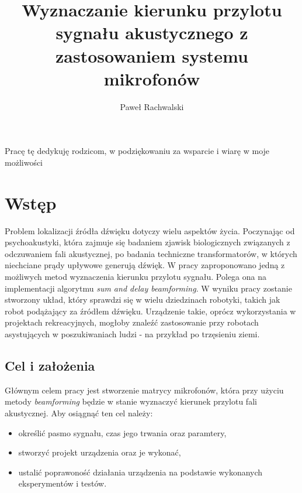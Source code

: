 \documentclass[eng,printmode]{mgr}
\title{Wyznaczanie kierunku przylotu sygnału akustycznego z zastosowaniem systemu mikrofonów}
\author{Paweł Rachwalski}
\begin{document}

\maketitle %
\dedication{6cm}{Pracę tę dedykuję rodzicom, w podziękowaniu za wsparcie i wiarę w moje możliwości}

\tableofcontents %

\chapter{Wstęp}
Problem lokalizacji źródła dźwięku dotyczy wielu aspektów życia. Poczynając od psychoakustyki, która zajmuje się badaniem zjawisk biologicznych związanych z odczuwaniem fali akustycznej, po badania techniczne transformatorów, w których niechciane prądy upływowe generują dźwięk. W pracy zaproponowano jedną z możliwych metod wyznaczenia kierunku przylotu sygnału. Polega ona na implementacji  algorytmu {\em sum and delay beamforming}. W wyniku pracy zostanie stworzony układ, który sprawdzi się w wielu dziedzinach robotyki, takich jak robot podążający za źródłem dźwięku. Urządzenie takie, oprócz wykorzystania w projektach rekreacyjnych, mogłoby znaleźć zastosowanie przy robotach asystujących w poszukiwaniach ludzi - na przykład po trzęsieniu ziemi.

\section{Cel i założenia}
Głównym celem pracy jest stworzenie matrycy mikrofonów, która przy użyciu metody {\em beamforming} będzie w stanie wyznaczyć kierunek przylotu fali akustycznej. Aby osiągnąć ten cel należy:
\begin{itemize}
\item określić pasmo sygnału, czas jego trwania oraz paramtery,
\item stworzyć projekt urządzenia oraz je wykonać,
\item ustalić poprawoność działania urządzenia na podstawie wykonanych eksperymentów i testów.
\end{itemize}
\end{document}
